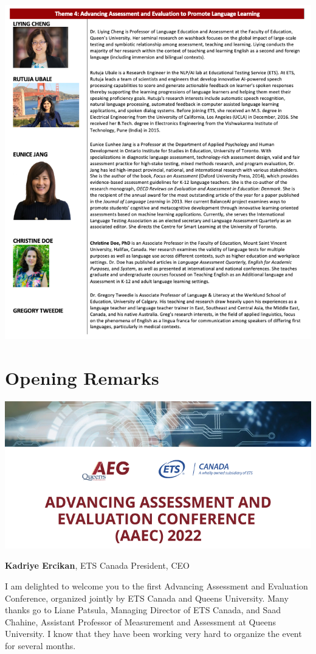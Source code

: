 \documentclass[
]{book}
\begin{document}
\includegraphics{Content/S4.png}

\newpage

\hypertarget{opening-remarks}{%
\chapter*{Opening Remarks}\label{opening-remarks}}

\includegraphics{Content/H.png}

\textbf{Kadriye Ercikan}, ETS Canada President, CEO

I am delighted to welcome you to the first Advancing Assessment and Evaluation Conference, organized jointly by ETS Canada and Queens University. Many thanks go to Liane Patsula, Managing Director of ETS Canada, and Saad Chahine, Assistant Professor of Measurement and Assessment at Queens University. I know that they have been working very hard to organize the event for several months.
\end{document}
